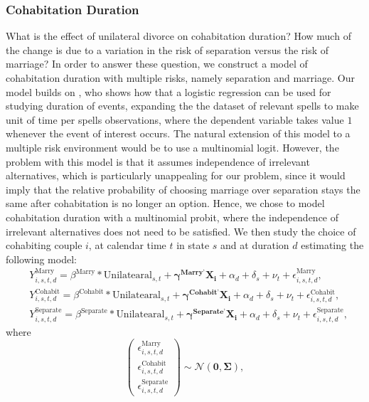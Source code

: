 \documentclass[12pt]{article}
\newcommand{\myvec}[1]{\ensuremath{\begin{pmatrix}#1\end{pmatrix}}}
\numberwithin{table}{section}
\begin{document}
\subsubsection*{Cohabitation Duration}
What is the effect of unilateral divorce on cohabitation duration? How much of the change is due to a variation in the risk of separation versus the risk of marriage? In order to answer these question, we construct a model of cohabitation duration with multiple risks, namely separation and marriage. Our model builds on \cite{jenkins1995}, who shows how that a logistic regression can be used for studying duration of events, expanding the the dataset of relevant spells to make unit of time per spells observations, where the dependent variable takes value $1$ whenever the event of interest occurs. The natural extension of this model to a multiple risk environment would be to use a multinomial logit. However, the problem with this model is that it assumes independence of irrelevant alternatives, which is particularly unappealing for our problem, since it would imply that the relative probability of choosing marriage over separation stays the same after cohabitation is no longer an option. Hence, we chose to model cohabitation duration with a multinomial probit, where the independence of irrelevant alternatives does not need to be satisfied. We then study the choice of cohabiting couple $i$, at calendar time $t$ in state $s$ and at duration $d$ estimating the following model: 
\begin{equation}\label{eq:probit_1}
\begin{split}
&Y_{i,s,t,d}^\text{Marry}=\beta^\text{Marry}*\text{Unilatearal}_{s,t}+\mathbf{\gamma^{\text{Marry'}}}\mathbf{X_i}+\alpha_d+\delta_s+\nu_t+\epsilon^{\text{Marry}}_{i,s,t,d},\\&
Y_{i,s,t,d}^\text{Cohabit}=\beta^\text{Cohabit}*\text{Unilatearal}_{s,t}+\mathbf{\gamma^{\text{Cohabit'}}}\mathbf{X_i}+\alpha_d+\delta_s+\nu_t+\epsilon^{\text{Cohabit}}_{i,s,t,d},\\&
Y_{i,s,t,d}^\text{Separate}=\beta^\text{Separate}*\text{Unilatearal}_{s,t}+\mathbf{\gamma^{\text{Separate'}}}\mathbf{X_i}+\alpha_d+\delta_s+\nu_t+\epsilon^{\text{Separate}}_{i,s,t,d},
\end{split}
\end{equation}
where
\begin{equation}\label{eq:probit_error}
\myvec{\epsilon_{i,s,t,d}^{\text{Marry}}\\\epsilon_{i,s,t,d}^{\text{Cohabit}}\\\epsilon_{i,s,t,d}^{\text{Separate}}}\sim\mathcal{N}(\mathbf{0},\mathbf{\Sigma}),
\end{equation}
\end{document}
